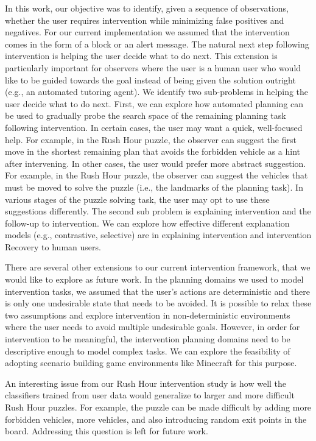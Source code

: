 In this work, our objective was to identify, given a sequence of observations, whether the user requires intervention while minimizing false positives and negatives. 
For our current implementation we assumed that the intervention comes in the form of a block or an alert message. 
The natural next step following intervention is helping the user decide what to do next. 
This extension is particularly important for observers where the user is a human user who would like to be guided towards the goal instead of being given the solution outright (e.g., an automated tutoring agent). 
We identify two sub-problems in helping the user decide what to do next. 
First, we can explore how automated planning can be used to gradually probe the search space of the remaining planning task following intervention. 
In certain cases, the user may want a quick, well-focused help. 
For example, in the Rush Hour puzzle, the observer can suggest the first move in the shortest remaining plan that avoids the forbidden vehicle as a hint after intervening. 
In other cases, the user would prefer more abstract suggestion. 
For example, in the Rush Hour puzzle, the observer can suggest the vehicles that must be moved to solve the puzzle (i.e., the landmarks of the planning task). 
In various stages of the puzzle solving task, the user may opt to use these suggestions differently. 
The second sub problem is explaining intervention and the follow-up to intervention. 
We can explore how effective different explanation models (e.g., contrastive, selective) are in explaining intervention and intervention Recovery to human users.

There are several other extensions to our current intervention framework, that we would like to explore as future work. 
In the planning domains we used to model intervention tasks, we assumed that the user's actions are deterministic and there is only one undesirable state that needs to be avoided. 
It is possible to relax these two assumptions and explore intervention in non-deterministic environments where the user needs to avoid multiple undesirable goals. 
However, in order for intervention to be meaningful, the intervention planning domains need to be descriptive enough to model complex tasks. 
We can explore the feasibility of adopting scenario building game environments like Minecraft for this purpose.

An interesting issue from our Rush Hour intervention study is how well the classifiers trained from user data would generalize to larger and more difficult Rush Hour puzzles.
For example, the puzzle can be made difficult by adding more forbidden vehicles, more vehicles, and also introducing random exit points in the board.
Addressing this question is left for future work.